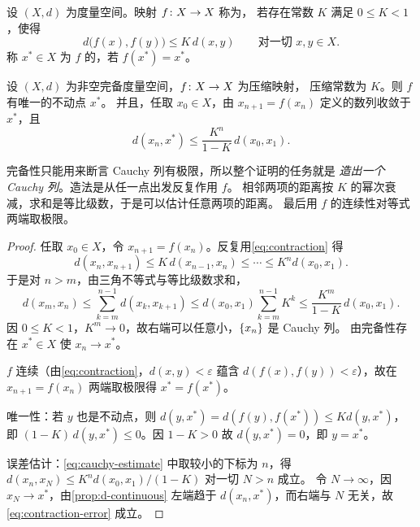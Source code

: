 \begin{definition}[压缩映射]
  \label{def:contraction}
  设 \((X,d)\) 为度量空间。映射 \(f \colon X \to X\) 称为，
  若存在常数 \(K\) 满足 \(0 \le K < 1\)，使得
  \begin{equation}
    \label{eq:contraction}
    d\bigl(f(x), f(y)\bigr) \le K\, d(x,y) \qquad \text{对一切 } x,y \in X.
  \end{equation}
  称 \(x^{*} \in X\) 为 \(f\) 的，若 \(f(x^{*}) = x^{*}\)。
\end{definition}

\begin{theorem}[压缩映射原理]
  \label{thm:contraction}
  设 \((X,d)\) 为非空完备度量空间，\(f \colon X \to X\) 为压缩映射，
  压缩常数为 \(K\)。则 \(f\) 有唯一的不动点 \(x^{*}\)。
  并且，任取 \(x_{0} \in X\)，由 \(x_{n+1} = f(x_{n})\) 定义的数列收敛于 \(x^{*}\)，且
  \begin{equation}
    \label{eq:contraction-error}
    d(x_{n}, x^{*}) \le \frac{K^{n}}{1-K}\, d(x_{0},x_{1}).
  \end{equation}
\end{theorem}

\begin{strategy}
  完备性只能用来断言 Cauchy 列有极限，所以整个证明的任务就是%
  \emph{造出一个 Cauchy 列}。造法是从任一点出发反复作用 \(f\)。
  相邻两项的距离按 \(K\) 的幂次衰减，求和是等比级数，于是可以估计任意两项的距离。
  最后用 \(f\) 的连续性对等式两端取极限。
\end{strategy}

\begin{proof}
  任取 \(x_{0} \in X\)，令 \(x_{n+1} = f(x_{n})\)。反复用\cref{eq:contraction} 得
  \begin{equation}
    \label{eq:iterate-decay}
    d(x_{n}, x_{n+1}) \le K\, d(x_{n-1},x_{n}) \le \cdots \le K^{n} d(x_{0},x_{1}).
  \end{equation}
  于是对 \(n > m\)，由三角不等式与等比级数求和，
  \begin{equation}
    \label{eq:cauchy-estimate}
    d(x_{m},x_{n}) \le \sum_{k=m}^{n-1} d(x_{k},x_{k+1})
      \le d(x_{0},x_{1}) \sum_{k=m}^{n-1} K^{k}
      \le \frac{K^{m}}{1-K}\, d(x_{0},x_{1}).
  \end{equation}
  因 \(0 \le K < 1\)，\(K^{m} \to 0\)，故右端可以任意小，\(\{x_{n}\}\) 是 Cauchy 列。
  由完备性存在 \(x^{*} \in X\) 使 \(x_{n} \to x^{*}\)。

  \(f\) 连续（由\cref{eq:contraction}，\(d(x,y)<\varepsilon\) 蕴含
  \(d(f(x),f(y))<\varepsilon\)），故在 \(x_{n+1} = f(x_{n})\) 两端取极限得
  \(x^{*} = f(x^{*})\)。

  唯一性：若 \(y\) 也是不动点，则
  \(d(y,x^{*}) = d(f(y),f(x^{*})) \le K d(y,x^{*})\)，
  即 \((1-K)\,d(y,x^{*}) \le 0\)。因 \(1-K>0\) 故 \(d(y,x^{*})=0\)，即 \(y=x^{*}\)。

  误差估计：\cref{eq:cauchy-estimate} 中取较小的下标为 \(n\)，得
  \(d(x_{n},x_{N}) \le K^{n} d(x_{0},x_{1})/(1-K)\) 对一切 \(N>n\) 成立。
  令 \(N \to \infty\)，因 \(x_{N} \to x^{*}\)，由\cref{prop:d-continuous}
  左端趋于 \(d(x_{n},x^{*})\)，而右端与 \(N\) 无关，故\cref{eq:contraction-error} 成立。
\end{proof}

